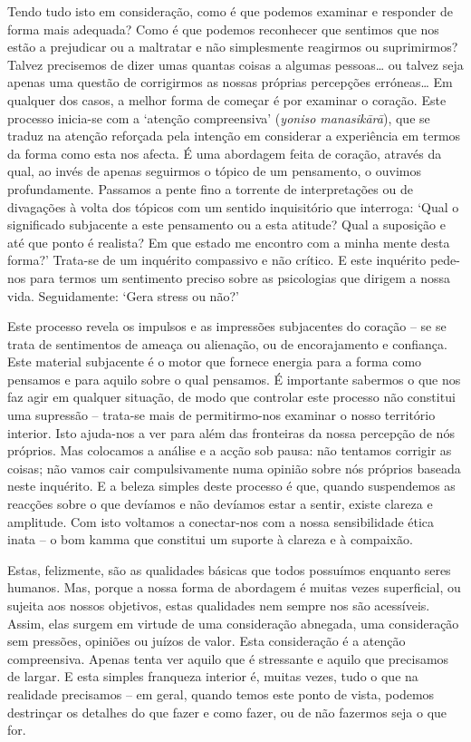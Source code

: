 Tendo tudo isto em consideração, como é que podemos examinar e responder de
forma mais adequada? Como é que podemos reconhecer que sentimos que nos estão a
prejudicar ou a maltratar e não simplesmente reagirmos ou suprimirmos? Talvez
precisemos de dizer umas quantas coisas a algumas pessoas\ldots{} ou talvez seja
apenas uma questão de corrigirmos as nossas próprias percepções erróneas\ldots{}
Em qualquer dos casos, a melhor forma de começar é por examinar o coração. Este
processo inicia-se com a `atenção compreensiva' (\emph{yoniso manasikārā}), que
se traduz na atenção reforçada pela intenção em considerar a experiência em
termos da forma como esta nos afecta. É uma abordagem feita de coração, através
da qual, ao invés de apenas seguirmos o tópico de um pensamento, o ouvimos
profundamente. Passamos a pente fino a torrente de interpretações ou de
divagações à volta dos tópicos com um sentido inquisitório que interroga: `Qual
o significado subjacente a este pensamento ou a esta atitude? Qual a suposição e
até que ponto é realista? Em que estado me encontro com a minha mente desta
forma?' Trata-se de um inquérito compassivo e não crítico. E este inquérito
pede-nos para termos um sentimento preciso sobre as psicologias que dirigem a
nossa vida. Seguidamente: `Gera stress ou não?'

Este processo revela os impulsos e as impressões subjacentes do coração -- se se
trata de sentimentos de ameaça ou alienação, ou de encorajamento e confiança.
Este material subjacente é o motor que fornece energia para a forma como
pensamos e para aquilo sobre o qual pensamos. É importante sabermos o que nos
faz agir em qualquer situação, de modo que controlar este processo não constitui
uma supressão -- trata-se mais de permitirmo-nos examinar o nosso território
interior. Isto ajuda-nos a ver para além das fronteiras da nossa percepção de
nós próprios. Mas colocamos a análise e a acção sob pausa: não tentamos corrigir
as coisas; não vamos cair compulsivamente numa opinião sobre nós próprios
baseada neste inquérito. E a beleza simples deste processo é que, quando
suspendemos as reacções sobre o que devíamos e não devíamos estar a sentir,
existe clareza e amplitude. Com isto voltamos a conectar-nos com a nossa
sensibilidade ética inata -- o bom kamma que constitui um suporte à clareza e à
compaixão.

Estas, felizmente, são as qualidades básicas que todos possuímos enquanto seres
humanos. Mas, porque a nossa forma de abordagem é muitas vezes superficial, ou
sujeita aos nossos objetivos, estas qualidades nem sempre nos são acessíveis.
Assim, elas surgem em virtude de uma consideração abnegada, uma consideração sem
pressões, opiniões ou juízos de valor. Esta consideração é a atenção
compreensiva. Apenas tenta ver aquilo que é stressante e aquilo que precisamos
de largar. E esta simples franqueza interior é, muitas vezes, tudo o que na
realidade precisamos -- em geral, quando temos este ponto de vista, podemos
destrinçar os detalhes do que fazer e como fazer, ou de não fazermos seja o que
for.

